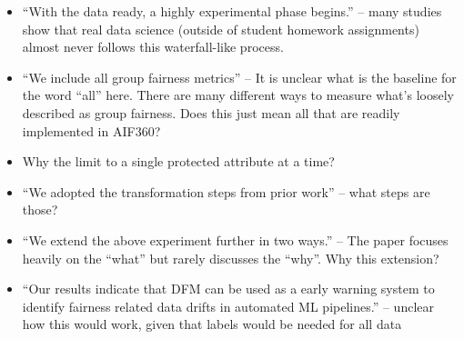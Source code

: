 \documentclass[conference]{IEEEtran}
\newcommand{\highlight}[1]{\begin{framed}%
  \noindent\emph{#1}
\end{framed}}
\begin{document}
\begin{itemize}

  \item ``With the data ready, a highly experimental phase begins.''
    -- many studies show that real data science (outside of student
    homework assignments) almost never follows this waterfall-like
    process.


  \item ``We include all group fairness metrics'' -- It is unclear
    what is the baseline for the word ``all'' here. There are many
    different ways to measure what’s loosely described as group
    fairness. Does this just mean all that are readily implemented in
    AIF360?


  \item Why the limit to a single protected attribute at a time?
  \item ``We adopted the transformation steps from prior work'' --
    what steps are those?
  \item ``We extend the above experiment further in two ways.'' -- The
    paper focuses heavily on the ``what'' but rarely discusses the
    “why”. Why this extension?




  \item ``Our results indicate that DFM can be used as a early warning
    system to identify fairness related data drifts in automated ML
    pipelines.'' -- unclear how this would work, given that labels
    would be needed for all data


\end{itemize}
\end{document}
